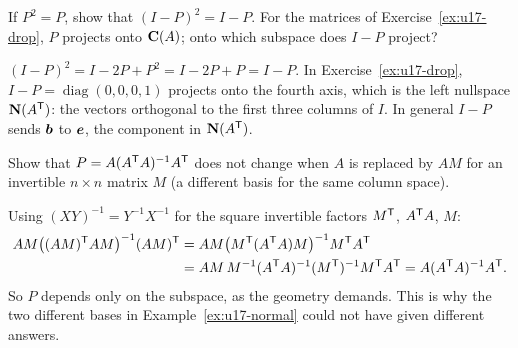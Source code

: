 \begin{exercise}\label{ex:u17-complement}
If $P^2=P$, show that $(I-P)^2=I-P$. For the matrices of
Exercise~\ref{ex:u17-drop}, $P$ projects onto $\mathbf{C}(A)$; onto which subspace does $I-P$
project?
\end{exercise}

\begin{solution}
$(I-P)^2=I-2P+P^2=I-2P+P=I-P$. In Exercise~\ref{ex:u17-drop},
$I-P=\operatorname{diag}(0,0,0,1)$ projects onto the fourth axis, which is the left nullspace
$\mathbf{N}(A^{\mathsf{T}})$: the vectors orthogonal to the first three columns of $I$. In general $I-P$ sends
$\boldsymbol{b}$ to $\boldsymbol{e}$, the component in $\mathbf{N}(A^{\mathsf{T}})$.
\end{solution}

\begin{exercise}\label{ex:u17-basis}
Show that $P=A(A^{\mathsf{T}} A)^{-1}A^{\mathsf{T}}$ does not change when $A$ is replaced by $AM$ for an invertible
$n\times n$ matrix $M$ (a different basis for the same column space).
\end{exercise}

\begin{solution}
Using $(XY)^{-1}=Y^{-1}X^{-1}$ for the square invertible factors $M^{\mathsf{T}}$, $A^{\mathsf{T}} A$, $M$:
\begin{align*}
  AM\bigl((AM)^{\mathsf{T}} AM\bigr)^{-1}(AM)^{\mathsf{T}}
  &=AM\bigl(M^{\mathsf{T}}(A^{\mathsf{T}} A)M\bigr)^{-1}M^{\mathsf{T}} A^{\mathsf{T}}\\
  &=AM\,M^{-1}(A^{\mathsf{T}} A)^{-1}(M^{\mathsf{T}})^{-1}M^{\mathsf{T}} A^{\mathsf{T}}
  =A(A^{\mathsf{T}} A)^{-1}A^{\mathsf{T}} .
\end{align*}
So $P$ depends only on the subspace, as the geometry demands. This is why the two
different bases in Example~\ref{ex:u17-normal} could not have given different answers.
\end{solution}
